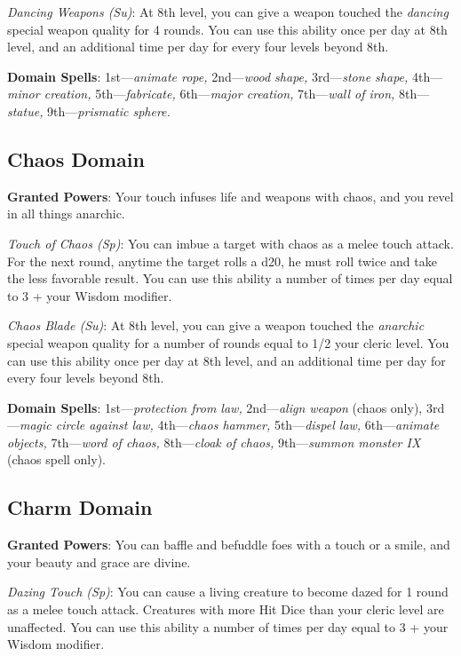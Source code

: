 \textit{Dancing Weapons (Su)}: At 8th level, you can give a weapon touched the \textit{dancing }special weapon quality for 4 rounds. You can use this ability once per day at 8th level, and an additional time per day for every four levels beyond 8th.
				
\textbf{Domain Spells}: 1st---\textit{animate rope, }2nd---\textit{wood shape, }3rd---\textit{stone shape, }4th---\textit{minor creation, }5th---\textit{fabricate, }6th---\textit{major creation, }7th---\textit{wall of iron, }8th---\textit{statue, }9th---\textit{prismatic sphere.}
				
\subsection{Chaos Domain}

				
\textbf{Granted Powers}: Your touch infuses life and weapons with chaos, and you revel in all things anarchic.
				
\textit{Touch of Chaos (Sp)}: You can imbue a target with chaos as a melee touch attack. For the next round, anytime the target rolls a d20, he must roll twice and take the less favorable result. You can use this ability a number of times per day equal to 3 + your Wisdom modifier.
				
\textit{Chaos Blade (Su)}: At 8th level, you can give a weapon touched the\textit{ anarchic }special weapon quality for a number of rounds equal to 1/2 your cleric level. You can use this ability once per day at 8th level, and an additional time per day for every four levels beyond 8th.
				
\textbf{Domain Spells}: 1st---\textit{protection from law, }2nd---\textit{align weapon }(chaos only), 3rd---\textit{magic circle against law, }4th---\textit{chaos hammer, }5th---\textit{dispel law, }6th---\textit{animate objects, }7th---\textit{word of chaos, }8th---\textit{cloak of chaos, }9th---\textit{summon monster IX} (chaos spell only).
				
\subsection{Charm Domain}

				
\textbf{Granted Powers}: You can baffle and befuddle foes with a touch or a smile, and your beauty and grace are divine.
				
\textit{Dazing Touch (Sp)}: You can cause a living creature to become dazed for 1 round as a melee touch attack. Creatures with more Hit Dice than your cleric level are unaffected. You can use this ability a number of times per day equal to 3 + your Wisdom modifier.
				
